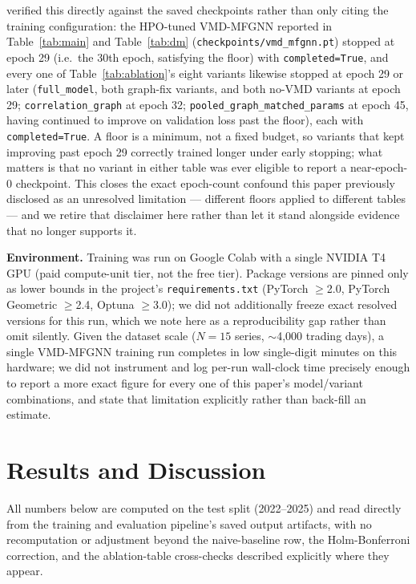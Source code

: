 \documentclass[journal]{IEEEtran}
\begin{document}
verified this directly against the saved checkpoints rather than only citing the training configuration: the HPO-tuned VMD-MFGNN reported in Table~\ref{tab:main} and Table~\ref{tab:dm} (\texttt{checkpoints/vmd\_mfgnn.pt}) stopped at epoch 29 (i.e.\ the 30th epoch, satisfying the floor) with \texttt{completed=True}, and every one of Table~\ref{tab:ablation}'s eight variants likewise stopped at epoch 29 or later (\texttt{full\_model}, both graph-fix variants, and both no-VMD variants at epoch 29; \texttt{correlation\_graph} at epoch 32; \texttt{pooled\_graph\_matched\_params} at epoch 45, having continued to improve on validation loss past the floor), each with \texttt{completed=True}. A floor is a minimum, not a fixed budget, so variants that kept improving past epoch 29 correctly trained longer under early stopping; what matters is that no variant in either table was ever eligible to report a near-epoch-0 checkpoint. This closes the exact epoch-count confound this paper previously disclosed as an unresolved limitation --- different floors applied to different tables --- and we retire that disclaimer here rather than let it stand alongside evidence that no longer supports it.

\textbf{Environment.} Training was run on Google Colab with a single NVIDIA T4 GPU (paid compute-unit tier, not the free tier). Package versions are pinned only as lower bounds in the project's \texttt{requirements.txt} (PyTorch $\geq$2.0, PyTorch Geometric $\geq$2.4, Optuna $\geq$3.0); we did not additionally freeze exact resolved versions for this run, which we note here as a reproducibility gap rather than omit silently. Given the dataset scale ($N=15$ series, $\sim$4{,}000 trading days), a single VMD-MFGNN training run completes in low single-digit minutes on this hardware; we did not instrument and log per-run wall-clock time precisely enough to report a more exact figure for every one of this paper's model/variant combinations, and state that limitation explicitly rather than back-fill an estimate.

\section{Results and Discussion}
\label{sec:results}

All numbers below are computed on the test split (2022--2025) and read directly from the training and evaluation pipeline's saved output artifacts, with no recomputation or adjustment beyond the naive-baseline row, the Holm-Bonferroni correction, and the ablation-table cross-checks described explicitly where they appear.
\end{document}
